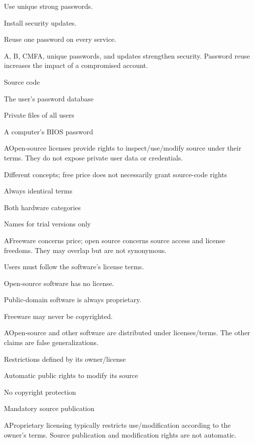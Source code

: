\begin{enumerate}[label=\textbf{Q\arabic*.}, leftmargin=*]
{   \item Use unique strong passwords.
   \item Install security updates.
   \item Reuse one password on every service.}
  {A, B, C}{MFA, unique passwords, and updates strengthen security. Password reuse increases the impact of a compromised account.}
\fi
\ifnum{}
  {\item Source code
   \item The user's password database
   \item Private files of all users
   \item A computer's BIOS password}
  {A}{Open-source licenses provide rights to inspect/use/modify source under their terms. They do not expose private user data or credentials.}
  {\item Different concepts; free price does not necessarily grant source-code rights
   \item Always identical terms
   \item Both hardware categories
   \item Names for trial versions only}
  {A}{Freeware concerns price; open source concerns source access and license freedoms. They may overlap but are not synonymous.}
  {\item Users must follow the software's license terms.
   \item Open-source software has no license.
   \item Public-domain software is always proprietary.
   \item Freeware may never be copyrighted.}
  {A}{Open-source and other software are distributed under licenses/terms. The other claims are false generalizations.}
  {\item Restrictions defined by its owner/license
   \item Automatic public rights to modify its source
   \item No copyright protection
   \item Mandatory source publication}
  {A}{Proprietary licensing typically restricts use/modification according to the owner's terms. Source publication and modification rights are not automatic.}

\end{enumerate}
